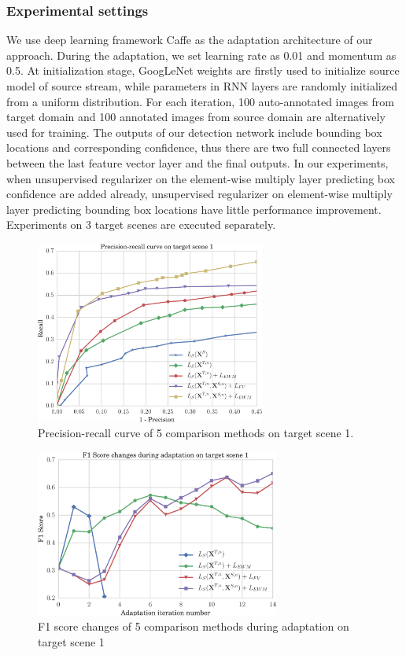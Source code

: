 \documentclass[runningheads]{llncs}
\begin{document}
\subsubsection{Experimental settings}
We use deep learning framework Caffe \cite{jia2014caffe} as the adaptation architecture of our approach. During the adaptation, we set learning rate as 0.01 and momentum as 0.5. At initialization stage, GoogLeNet weights are firstly used to initialize source model of source stream, while parameters in RNN layers are randomly initialized from a uniform distribution. For each iteration, 100 auto-annotated images from target domain and 100 annotated images from source domain are alternatively used for training. The outputs of our detection network include bounding box locations and corresponding confidence, thus there are two full connected layers between the last feature vector layer and the final outputs. In our experiments, when unsupervised regularizer on the element-wise multiply layer predicting box confidence are added already, unsupervised regularizer on element-wise multiply layer predicting bounding box locations have little performance improvement. Experiments on 3 target scenes are executed separately.

\begin{figure}
\centering
\includegraphics[height=6cm]{images/pr_curve.pdf}
\caption{Precision-recall curve of 5 comparison methods on target scene 1.}
\label{fig:pr_curve}
\end{figure}

\begin{figure}
\centering
\includegraphics[height=5.5cm]{images/f1_score.pdf}
\caption{F1 score changes of 5 comparison methods during adaptation on target scene 1}
\label{fig:f1_score}
\end{figure}
\end{document}
